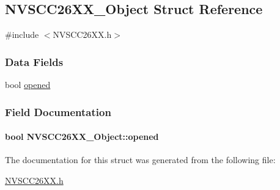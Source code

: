 \subsection{N\+V\+S\+C\+C26\+X\+X\+\_\+\+Object Struct Reference}
\label{struct_n_v_s_c_c26_x_x___object}


{\ttfamily \#include $<$N\+V\+S\+C\+C26\+X\+X.\+h$>$}

\subsubsection*{Data Fields}
\begin{DoxyCompactItemize}
\item 
bool \hyperlink{struct_n_v_s_c_c26_x_x___object_a6efb4e8388b62e19e411d12299ebdcce}{opened}
\end{DoxyCompactItemize}


\subsubsection{Field Documentation}
\paragraph[{opened}]{\setlength{\rightskip}{0pt plus 5cm}bool N\+V\+S\+C\+C26\+X\+X\+\_\+\+Object\+::opened}\label{struct_n_v_s_c_c26_x_x___object_a6efb4e8388b62e19e411d12299ebdcce}


The documentation for this struct was generated from the following file\+:\begin{DoxyCompactItemize}
\item 
\hyperlink{_n_v_s_c_c26_x_x_8h}{N\+V\+S\+C\+C26\+X\+X.\+h}\end{DoxyCompactItemize}
